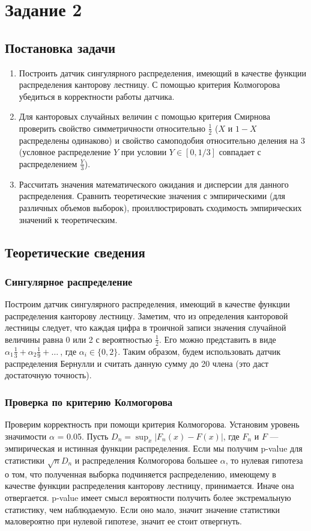 \documentclass{article}
\theoremstyle{definition}
\begin{document}
\section{Задание 2}
\subsection{Постановка задачи}
\begin{enumerate}
    \item Построить датчик сингулярного распределения, имеющий в качестве функции
распределения канторову лестницу. С помощью критерия Колмогорова убедиться в корректности работы датчика.
    \item Для канторовых случайных величин с помощью критерия Смирнова проверить свойство симметричности относительно \(\frac{1}{2}\) (\(X\) и \(1 - X\) распределены одинаково)
и свойство самоподобия относительно деления на 3 (условное распределение \(Y\)
при условии \(Y \in [0, 1/3]\) совпадает с распределением \(\frac{Y}{3}\)).
    \item Рассчитать значения математического ожидания и дисперсии для данного распределения. Сравнить теоретические значения с эмпирическими (для различных объемов выборок), проиллюстрировать сходимость эмпирических значений
к теоретическим.
\end{enumerate}

\subsection{Теоретические сведения}

\subsubsection{Сингулярное распределение}
Построим датчик сингулярного распределения, имеющий в качестве функции распределения канторову лестницу. Заметим, что из определения канторовой лестницы следует, что каждая цифра в троичной записи значения случайной величины равна 0 или 2 с вероятностью $\frac{1}{2}$. Его можно представить в виде $\alpha_1 \frac{1}{3} + \alpha_2 \frac{1}{9} + \dots \ $, где $\alpha_i \in \{0, 2\}$. Таким образом, будем использовать датчик распределения Бернулли и считать данную сумму до 20 члена (это даст достаточную точность).
\subsubsection{Проверка по критерию Колмогорова}
Проверим корректность при помощи критерия Колмогорова. Установим уровень значимости $\alpha$ = 0.05. Пусть $D_n = \sup_x \lvert F_n(x) - F(x) \rvert$, где $F_n$ и $F$ --- эмпирическая и истинная функции распределения. Если мы получим p-value для статистики $\sqrt n D_n$ и распределения Колмогорова большее $\alpha$, то нулевая гипотеза о том, что полученная выборка подчиняется распределению, имеющему в качестве функции распределения канторову лестницу, принимается. Иначе она отвергается. p-value имеет смысл вероятности получить более экстремальную статистику, чем наблюдаемую. Если оно мало, значит значение статистики маловероятно при нулевой гипотезе, значит ее стоит отвергнуть.
\end{document}
